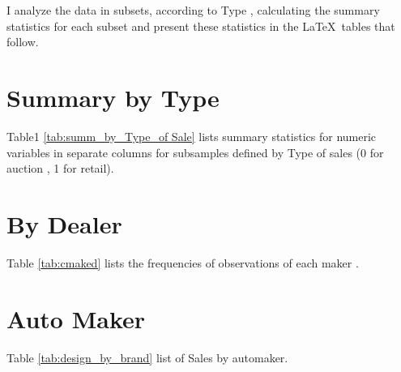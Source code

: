 \documentclass[11pt]{article}
\begin{document}
\medskip
\noindent
I analyze the data in subsets, according to Type , 
calculating the summary statistics for each subset and present these 
statistics in the \LaTeX\ tables that follow.

\vfill



\section{Summary by Type}

Table1  \ref{tab:summ_by_Type_of Sale} lists summary statistics for numeric variables
in separate columns for subsamples defined by Type of sales (0 for auction , 1 for retail). 





\section{By  Dealer}

Table \ref{tab:cmaked} lists the frequencies of observations of 
each maker . 




\section{Auto Maker}

Table \ref{tab:design_by_brand} list of Sales by automaker. 





\end{document}
